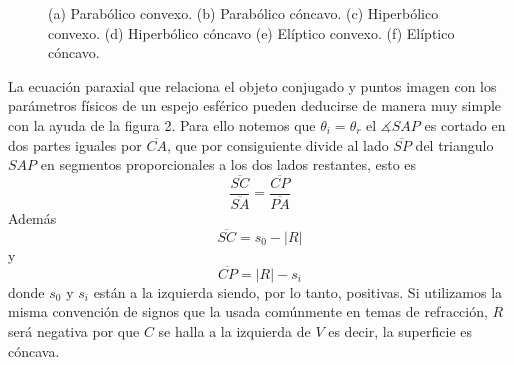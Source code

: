 \documentclass[13,twocolumn,letterpaper]{article}
\begin{document}
{\begin{figure}[h!]
	\hspace{0.5 cm}
	\hspace{0.5 cm}
	\caption{{\small  {(a) Parabólico convexo. (b) Parabólico cóncavo. (c) Hiperbólico convexo. (d) Hiperbólico cóncavo (e) Elíptico convexo. (f) Elíptico cóncavo.}}}
	\label{fig:fig1}
\end{figure}


	La ecuación paraxial que relaciona el objeto conjugado y puntos imagen con los parámetros físicos de un espejo esférico pueden deducirse de manera muy simple con la ayuda de la figura 2. Para ello notemos que  $\theta_{i}=\theta_{r}$ el $\measuredangle SAP$ es cortado en dos partes iguales por $\overline{CA}$, que por consiguiente divide al lado $\overline{SP}$ del triangulo $SAP$ en segmentos proporcionales a los dos lados restantes, esto es
\begin{equation}
\dfrac{\overline{SC}}{\overline{SA}}=\dfrac{\overline{CP}}{\overline{PA}}
\end{equation}
	Además
	$$\overline{SC}=s_{0}-|R|$$
	y
	$$\overline{CP}=|R|-s_{i}$$
	donde $s_{0}$ y $s_{i}$ están a la izquierda siendo, por lo tanto, positivas. Si utilizamos la misma convención de signos que la usada comúnmente en temas de refracción, $R$ será negativa por que $C$ se halla  a la izquierda de $V$ es decir, la superficie es cóncava. 
	 
}
\end{document}
